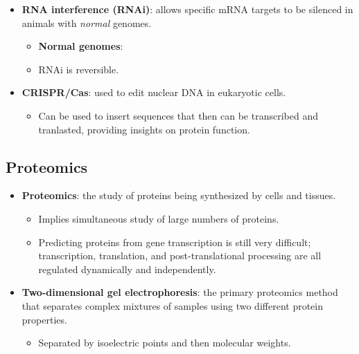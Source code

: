 \documentclass[12pt,a4paper]{article}
\begin{document}
\begin{itemize}
\begin{itemize}
\begin{itemize}
\begin{itemize}
                    \end{itemize}
                    \item \textbf{RNA interference (RNAi)}: allows specific mRNA targets to be silenced in animals with \textit{normal} genomes.
                        \begin{itemize}
                            \item \textbf{Normal genomes}:
                            \item RNAi is reversible.
                        \end{itemize}
                    \item \textbf{CRISPR/Cas}: used to edit nuclear DNA in eukaryotic cells.
                        \begin{itemize}
                            \item Can be used to insert sequences that then can be transcribed and tranlasted, providing insights on protein function.
                        \end{itemize}
                \end{itemize}
        \end{itemize}
\end{itemize}

\subsection{Proteomics}
\begin{itemize}
    \item \textbf{Proteomics}: the study of proteins being synthesized by cells and tissues.
        \begin{itemize}
            \item Implies simultaneous study of large numbers of proteins.
            \item Predicting proteins from gene transcription is still very difficult; transcription, translation, and post-translational processing are all regulated dynamically and independently.
        \end{itemize}
    \item \textbf{Two-dimensional gel electrophoresis}: the primary proteomics method that separates complex mixtures of samples using two different protein properties.
        \begin{itemize}
            \item Separated by {\color{o-Sun}isoelectric points} and then {\color{o-Sun}molecular weights}.
        \end{itemize}
\end{itemize}
\end{document}
